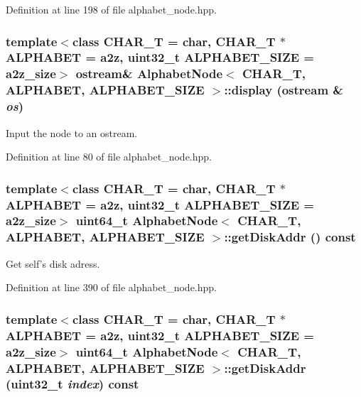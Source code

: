 Definition at line 198 of file alphabet\_\-node.hpp.\hypertarget{classAlphabetNode_474bbf96a8cc0bb25337340628d18e94}{
\subsubsection[{display}]{\setlength{\rightskip}{0pt plus 5cm}template$<$class CHAR\_\-T  = char, CHAR\_\-T $\ast$ ALPHABET = a2z, uint32\_\-t ALPHABET\_\-SIZE = a2z\_\-size$>$ ostream\& {\bf AlphabetNode}$<$ CHAR\_\-T, ALPHABET, ALPHABET\_\-SIZE $>$::display (ostream \& {\em os})}}
\label{classAlphabetNode_474bbf96a8cc0bb25337340628d18e94}


Input the node to an ostream. 

Definition at line 80 of file alphabet\_\-node.hpp.\hypertarget{classAlphabetNode_000a733fadb9bfebe02fb8d969d6e460}{
\subsubsection[{getDiskAddr}]{\setlength{\rightskip}{0pt plus 5cm}template$<$class CHAR\_\-T  = char, CHAR\_\-T $\ast$ ALPHABET = a2z, uint32\_\-t ALPHABET\_\-SIZE = a2z\_\-size$>$ uint64\_\-t {\bf AlphabetNode}$<$ CHAR\_\-T, ALPHABET, ALPHABET\_\-SIZE $>$::getDiskAddr () const}}
\label{classAlphabetNode_000a733fadb9bfebe02fb8d969d6e460}


Get self's disk adress. 

Definition at line 390 of file alphabet\_\-node.hpp.\hypertarget{classAlphabetNode_271f004c2a74d883b663b425ef6e960b}{
\subsubsection[{getDiskAddr}]{\setlength{\rightskip}{0pt plus 5cm}template$<$class CHAR\_\-T  = char, CHAR\_\-T $\ast$ ALPHABET = a2z, uint32\_\-t ALPHABET\_\-SIZE = a2z\_\-size$>$ uint64\_\-t {\bf AlphabetNode}$<$ CHAR\_\-T, ALPHABET, ALPHABET\_\-SIZE $>$::getDiskAddr (uint32\_\-t {\em index}) const}}
\label{classAlphabetNode_271f004c2a74d883b663b425ef6e960b}


